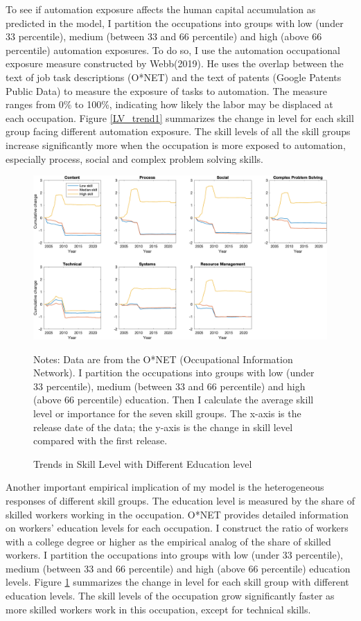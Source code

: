 \documentclass[12pt]{article}
\begin{document}
To see if automation exposure affects the human capital accumulation as predicted in the model, I partition the occupations into groups with low (under 33 percentile), medium (between 33 and 66 percentile) and high (above 66 percentile) automation exposures. To do so, I use the automation occupational exposure measure constructed by Webb(2019)\nocite{Webb2019}. He uses the overlap between the text of job task descriptions (O*NET) and the text of patents (Google Patents Public Data) to measure the exposure of tasks to automation. The measure ranges from 0\% to 100\%, indicating how likely the labor may be displaced at each occupation. Figure \ref{LV_trend1} summarizes the change in level for each skill group facing different automation exposure. The skill levels of all the skill groups increase significantly more when the occupation is more exposed to automation, especially process, social and complex problem solving skills. 

\begin{figure}[h!]
\includegraphics[width = \textwidth]{LV_trend2}
\caption{Trends in Skill Level with Different Education level}
\label{LV_trend2}
{\scriptsize Notes: Data are from the O*NET (Occupational Information Network). I partition the occupations into groups with low (under 33 percentile), medium (between 33 and 66 percentile) and high (above 66 percentile) education. Then I calculate the average skill level or importance for the seven skill groups. The x-axis is the release date of the data; the y-axis is the change in skill level compared with the first release. }
\end{figure}

Another important empirical implication of my model is the heterogeneous responses of different skill groups. The education level is measured by the share of skilled workers working in the occupation. O*NET provides detailed information on workers' education levels for each occupation. I construct the ratio of workers with a college degree or higher as the empirical analog of the share of skilled workers. I partition the occupations into groups with low (under 33 percentile), medium (between 33 and 66 percentile) and high (above 66 percentile) education levels. Figure \ref{LV_trend2} summarizes the change in level for each skill group with different education levels. The skill levels of the occupation grow significantly faster as more skilled workers work in this occupation, except for technical skills. 
\end{document}
